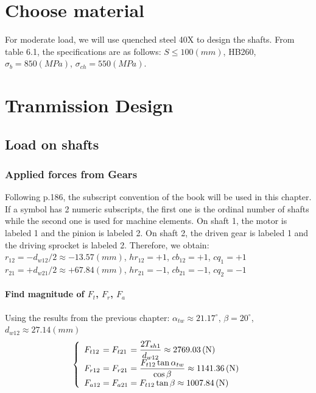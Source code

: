 \section{Choose material}
For moderate load, we will use quenched steel 40X to design the shafts. From table 6.1, the specifications are as follows: $ S \leq 100\unit{(mm)} $, HB260, $ \sigma_b = 850\unit{(MPa)}$, $ \sigma_{ch} = 550\unit{(MPa)}$. 

\section{Tranmission Design}
\subsection{Load on shafts}
\subsubsection{Applied forces from Gears}
Following p.186, the subscript convention of the book will be used in this chapter. If a symbol has 2 numeric subscripts, the first one is the ordinal number of shafts while the second one is used for machine elements. On shaft 1, the motor is labeled 1 and the pinion is labeled 2. On shaft 2, the driven gear is labeled 1 and the driving sprocket is labeled 2. Therefore, we obtain:\\
$ r_{12} = -d_{w12}/2 \approx -13.57\unit{(mm)}$, $ hr_{12} = +1 $, $ cb_{12} = +1 $, $ cq_1 = +1 $\\
$ r_{21} = +d_{w21}/2 \approx +67.84\unit{(mm)}$, $ hr_{21} = -1 $, $ cb_{21} = -1$, $ cq_2 = -1$
\paragraph{Find magnitude of $ F_{t} $, $ F_r $, $ F_a $}
Using the results from the previous chapter: $ \alpha_{tw} \approx 21.17^\circ $, $ \beta = 20^\circ $, $ d_{w12}\approx 27.14\unit{(mm)} $
\[
\left\{ 
\begin{array}{l@{{}={}}l@{{}={}}l}
F_{t12}& F_{t21}& \dfrac{2T_{sh1}}{d_{w12}}\approx 2769.03\unit{(N)}\\
F_{r12}& F_{r21}&  \dfrac{F_{t12}\tan\alpha_{tw}}{\cos\beta}\approx1141.36\unit{(N)}\\
F_{a12}& F_{a21}& F_{t12}\tan\beta\approx1007.84\unit{(N)}\\ 
\end{array}
\right.
\]
